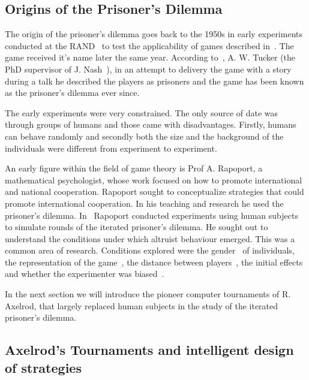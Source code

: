 \documentclass{article}
\theoremstyle{definition}
\begin{document}
\subsection{Origins of the Prisoner's Dilemma}\label{section:origin}

The origin of the prisoner's dilemma goes back to the 1950s in early experiments
conducted at the RAND~\cite{Flood1958} to test the applicability of games
described in~\cite{VonNeumann1944}. The game received it's name later the same year.
According to~\cite{Tucker1983}, A. W. Tucker (the PhD supervisor of J. Nash~\cite{Nash1951}),
in an attempt to delivery the game with a story during a talk he described the players
as prisoners and the game has been known as the prisoner's dilemma ever since.

The early experiments were very constrained. The only source of date was
through groups of humans and those came with disadvantages. Firstly, humans can
behave randomly and secondly both the size and the background of the
individuals were different from experiment to experiment.

An early figure within the field of game theory
is Prof A. Rapoport, a mathematical psychologist, whose work focused on
how to promote international and national cooperation. Rapoport sought to conceptualize
strategies that could promote international cooperation. In his teaching and research
he used the prisoner's dilemma.
In~\cite{rapoport1965} Rapoport conducted experiments using human subjects
to simulate rounds of the iterated prisoner's dilemma. He sought out to understand
the conditions under which altruist behaviour emerged. This was a common area of
research.
Conditions explored were the gender~\cite{Evans1966, Lutzker1961, Mack1971} of
individuals, the representation of the game~\cite{Evans1966}, the distance between
players~\cite{Sensenig1972}, the initial effects~\cite{Tedeschi1968} and whether
the experimenter was biased~\cite{Gallo1968}.

In the next section we will introduce the pioneer computer tournaments of R. Axelrod,
that largely replaced human subjects in the study of the iterated prisoner's dilemma.

\subsection{Axelrod's Tournaments and intelligent design of strategies}\label{subsection:intelligent_design}
\end{document}
